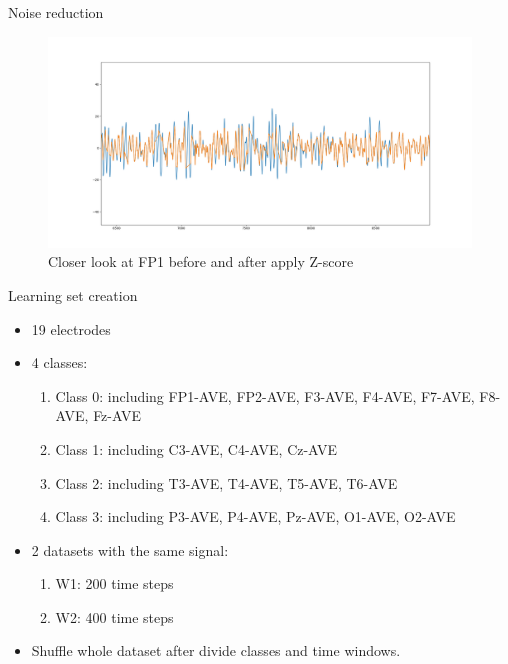 \documentclass[xcolor=dvipsnames]{beamer} %
\begin{document}
	\begin{frame}{Noise reduction}
	    \begin{figure}
	        \centering
	        \includegraphics[scale=0.23]{images/Figure_1.png}
	        \caption{Closer look at FP1 before and after apply Z-score}
	        \label{fig:FP1close}
	    \end{figure}
	\end{frame}
	
	\begin{frame}{Learning set creation}
	    \begin{itemize}
	        \item 19 electrodes
	        \item 4 classes:
	            \begin{enumerate}
	                \item Class 0: including FP1-AVE, FP2-AVE, F3-AVE, F4-AVE, F7-AVE, F8-AVE, Fz-AVE
	                \item Class 1: including C3-AVE, C4-AVE, Cz-AVE
	                \item Class 2: including T3-AVE, T4-AVE, T5-AVE, T6-AVE
	                \item Class 3: including P3-AVE, P4-AVE, Pz-AVE, O1-AVE,  O2-AVE
	            \end{enumerate}
	        \item 2 datasets with the same signal:
	            \begin{enumerate}
	                \item W1: 200 time steps
	                \item W2: 400 time steps
	            \end{enumerate}
	       \item Shuffle whole dataset after divide classes and time windows.
	    \end{itemize}
	\end{frame}
	
\end{document}
